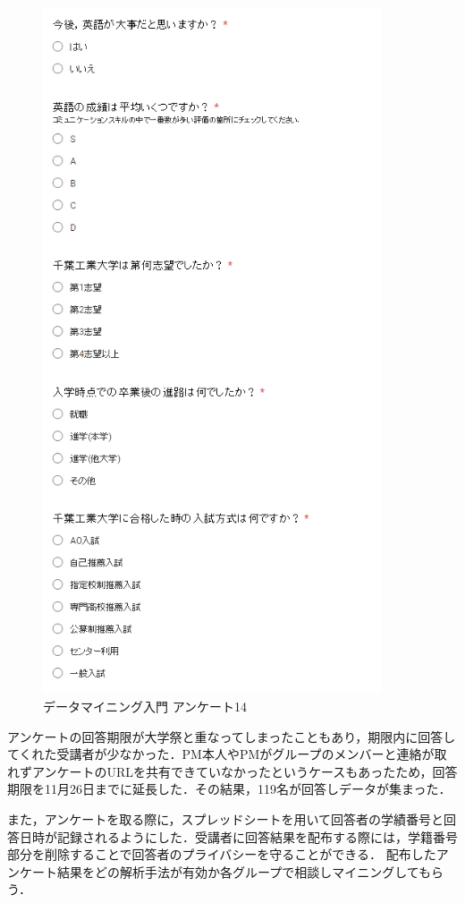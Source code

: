 \begin{figure}[p]
\centering
\includegraphics[width=10cm]{forms17.PNG}
\caption{データマイニング入門 アンケート14}\label{サンプル図}
\end{figure}

\newpage

アンケートの回答期限が大学祭と重なってしまったこともあり，期限内に回答してくれた受講者が少なかった．PM本人やPMがグループのメンバーと連絡が取れずアンケートのURLを共有できていなかったというケースもあったため，回答期限を11月26日までに延長した．その結果，119名が回答しデータが集まった．

また，アンケートを取る際に，スプレッドシートを用いて回答者の学績番号と回答日時が記録されるようにした．受講者に回答結果を配布する際には，学籍番号部分を削除することで回答者のプライバシーを守ることができる．
配布したアンケート結果をどの解析手法が有効か各グループで相談しマイニングしてもらう．

